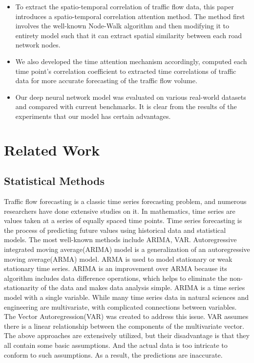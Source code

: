 \documentclass[conference]{IEEEtran}
\begin{document}
\begin{itemize}
    \item To extract the spatio-temporal correlation of traffic flow data, this paper introduces a spatio-temporal correlation attention method. The method first involves the well-known Node-Walk algorithm and then modifying it to entirety model such that it can extract spatial similarity between each road network nodes. 
    \item We also developed the time attention mechanism accordingly, computed each time point's correlation coefficient to extracted time correlations of traffic data for more accurate forecasting of the traffic flow volume.
    \item Our deep neural network model was evaluated on various real-world datasets and compared with current benchmarks. It is clear from the results of the experiments that our model has certain advantages.
\end{itemize}

\section{Related Work}

\subsection{Statistical Methods}
Traffic flow forecasting is a classic time series forecasting problem, and numerous researchers have done extensive studies on it\cite{b6}. In mathematics, time series are values taken at a series of equally spaced time points. Time series forecasting is the process of predicting future values using historical data and statistical models. The most well-known methods include ARIMA, VAR\cite{b7}. Autoregressive integrated moving average(ARIMA) model is a generalization of an autoregressive moving average(ARMA) model. ARMA is used to model stationary or weak stationary time series. ARIMA is an improvement over ARMA because its algorithm includes data difference operations, which helps to eliminate the non-stationarity of the data and makes data analysis simple. ARIMA is a time series model with a single variable. While many time series data in natural sciences and engineering are multivariate, with complicated connections between variables. The Vector Autoregression(VAR) was created to address this issue. VAR assumes there is a linear relationship between the components of the multivariate vector. The above approaches are extensively utilized, but their disadvantage is that they all contain some basic assumptions. And the actual data is too intricate to conform to such assumptions. As a result, the predictions are inaccurate.
\end{document}
